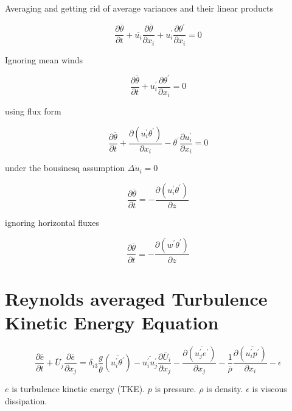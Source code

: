 Averaging and getting rid of average variances and their linear products

\begin{equation}
\frac{\partial \overline{\theta}}{\partial t} + \overline{u_{i}}\frac{\partial \overline{\theta}}{\partial x_{i}} + u_{i}^{'}\frac{\partial \theta^{'}}{\partial x_{i}} = 0
\end{equation}

Ignoring mean winds

\begin{equation}
\frac{\partial \overline{\theta}}{\partial t} + u_{i}^{'}\frac{\partial \theta^{'}}{\partial x_{i}} = 0
\end{equation}

using flux form

\begin{equation}
\frac{\partial \overline{\theta}}{\partial t} + \frac{\partial(u_{i}^{'}\theta^{'})}{\partial x_{i}} - \theta^{'}\frac{\partial u_{i}^{'}}{\partial x_{i}}= 0
\end{equation}

under the bousinesq assumption $\Delta \dot u_{i} = 0$

\begin{equation}
\frac{\partial \overline{\theta}}{\partial t} = -\frac{\partial(u_{i}^{'}\theta^{'})}{\partial z}
\end{equation}

ignoring horizontal fluxes

\begin{equation}
\frac{\partial \overline{\theta}}{\partial t} = -\frac{\partial(w^{'}\theta^{'})}{\partial z}
\end{equation}

\section{Reynolds averaged Turbulence Kinetic Energy Equation}

\begin{equation}
\frac{\partial \overline{e}}{\partial t} + \overline{U}_{j} \frac{\partial \overline{e}}{\partial x_{j}} = \delta_{i3}  \frac{g}{\overline{\theta}} \left( \overline{u_{i}^{'}\theta^{'}} \right) - \overline{u_{i}^{'}u_{j}^{'}}\frac{\partial \overline{U}_{i}}{\partial x_{j}} - \frac{ \partial \left( \overline{u_{j}^{'}e^{'}} \right)}{\partial x_{j}} - \frac{1}{\overline{\rho}} \frac{\partial \left( \overline{u_{i}^{'} p^{'}} \right) }{\partial x_{i}} - \epsilon
\end{equation}

$e$ is turbulence kinetic energy (TKE).  $p$ is pressure.  $\rho$ is density.  $\epsilon$ is viscous dissipation.


\endinput

